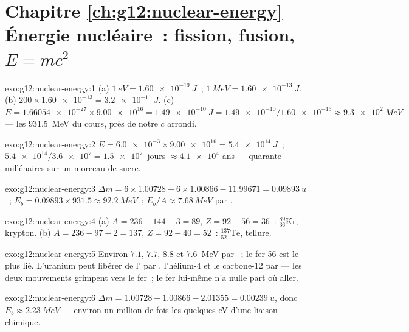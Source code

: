 \section*{Chapitre \ref{ch:g12:nuclear-energy} --- Énergie nucléaire~: fission, fusion, $E=mc^2$}

\begin{solution}{exo:g12:nuclear-energy:1}
(a) $\qty{1}{eV} = \qty{1.60e-19}{J}$~;
$\qty{1}{MeV} = \qty{1.60e-13}{J}$.
(b) $200 \times \num{1.60e-13} = \qty{3.2e-11}{J}$.
(c) $E = \num{1.66054e-27} \times \num{9.00e16} = \qty{1.49e-10}{J}
= \num{1.49e-10}/\num{1.60e-13} \approx \qty{9.3e2}{MeV}$ --- les
\qty{931.5}{MeV} du cours, près de notre $c$ arrondi.
\end{solution}

\begin{solution}{exo:g12:nuclear-energy:2}
$E = \num{6.0e-3} \times \num{9.00e16} = \qty{5.4e14}{J}$~;
$\num{5.4e14}/\num{3.6e7} = \num{1.5e7}$~jours $\approx \num{4.1e4}$
ans --- quarante millénaires sur un morceau de sucre.
\end{solution}

\begin{solution}{exo:g12:nuclear-energy:3}
$\Delta m = 6 \times 1.00728 + 6 \times 1.00866 - 11.99671 =
\qty{0.09893}{u}$~; $E_b = 0.09893 \times 931.5 \approx \qty{92.2}{MeV}$~;
$E_b/A \approx \qty{7.68}{MeV}$ par
.
\end{solution}

\begin{solution}{exo:g12:nuclear-energy:4}
(a) $A = 236 - 144 - 3 = 89$, $Z = 92 - 56 = 36$~:
${}^{89}_{36}\mathrm{Kr}$, krypton.
(b) $A = 236 - 97 - 2 = 137$, $Z = 92 - 40 = 52$~:
${}^{137}_{52}\mathrm{Te}$, tellure.
\end{solution}

\begin{solution}{exo:g12:nuclear-energy:5}
Environ $7.1$, $7.7$, $8.8$ et \qty{7.6}{MeV} par
~; le fer-56 est le plus lié.
L'uranium peut libérer de l' par
, l'hélium-4 et le carbone-12 par
 --- les deux mouvements grimpent vers le fer~;
le fer lui-même n'a nulle part où aller.
\end{solution}

\begin{solution}{exo:g12:nuclear-energy:6}
$\Delta m = 1.00728 + 1.00866 - 2.01355 = \qty{0.00239}{u}$, donc
$E_b \approx \qty{2.23}{MeV}$ --- environ un million de fois les
quelques \unit{eV} d'une liaison chimique.
\end{solution}

